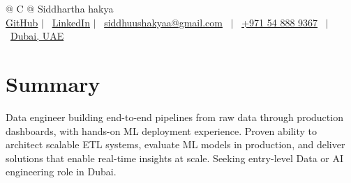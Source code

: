 \documentclass[a4paper,12pt]{article}
\begin{document}
\pagestyle{empty} 



\begin{tabularx}{\linewidth}{@{} C @{}}
\Huge{Siddhartha hakya} \\[7.5pt]
\href{https://github.com/SiddhuShkya}{GitHub} $|$ \ 
\href{https://www.linkedin.com/in/sidShkya/}{LinkedIn} $|$ \
\href{mailto:siddhuushakyaa@gmail.com}{siddhuushakyaa@gmail.com} \ $|$ \ 
\href{tel:+971548889367}{+971 54 888 9367} \ $|$ \ 
\href{https://maps.google.com/?q=International+City,+Dubai}{Dubai, UAE} \\
\end{tabularx}


\section{Summary}
Data engineer building end-to-end pipelines from raw data through production dashboards, with hands-on ML deployment experience. Proven ability to architect scalable ETL systems, evaluate ML models in production, and deliver solutions that enable real-time insights at scale. Seeking entry-level Data or AI engineering role in Dubai.

\end{document}
